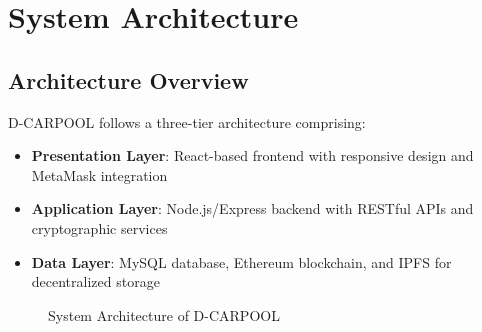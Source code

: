 \chapter{System Architecture}

\section{Architecture Overview}

D-CARPOOL follows a three-tier architecture comprising:

\begin{itemize}
    \item \textbf{Presentation Layer}: React-based frontend with responsive design and MetaMask integration
    \item \textbf{Application Layer}: Node.js/Express backend with RESTful APIs and cryptographic services
    \item \textbf{Data Layer}: MySQL database, Ethereum blockchain, and IPFS for decentralized storage
\end{itemize}

\begin{figure}[H]
\centering
{}
\caption{System Architecture of D-CARPOOL}
\end{figure}

